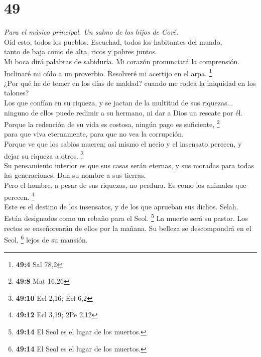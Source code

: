 \hypertarget{section-47}{%
\section{49}\label{section-47}}

\emph{Para el músico principal. Un salmo de los hijos de Coré.}\\
 Oíd esto, todos los pueblos. Escuchad, todos los
habitantes del mundo,\\
 tanto de baja como de alta, ricos y pobres juntos.\\
 Mi boca dirá palabras de sabiduría. Mi corazón
pronunciará la comprensión.\\
 Inclinaré mi oído a un proverbio. Resolveré mi acertijo
en el arpa. \footnote{\textbf{49:4} Sal 78,2}\\
 ¿Por qué he de temer en los días de maldad? cuando me
rodea la iniquidad en los talones?\\
 Los que confían en su riqueza, y se jactan de la multitud
de sus riquezas...\\
 ninguno de ellos puede redimir a su hermano, ni dar a
Dios un rescate por él.\\
 Porque la redención de su vida es costosa, ningún pago es
suficiente, \footnote{\textbf{49:8} Mat 16,26}\\
 para que viva eternamente, para que no vea la
corrupción.\\
 Porque ve que los sabios mueren; así mismo el necio y el
insensato perecen, y dejar su riqueza a otros. \footnote{\textbf{49:10}
  Ecl 2,16; Ecl 6,2}\\
 Su pensamiento interior es que sus casas serán eternas,
y sus moradas para todas las generaciones. Dan su nombre a sus
tierras.\\
 Pero el hombre, a pesar de sus riquezas, no perdura. Es
como los animales que perecen. \footnote{\textbf{49:12} Ecl 3,19; 2Pe
  2,12}\\
 Este es el destino de los insensatos, y de los que
aprueban sus dichos. Selah.\\
 Están designados como un rebaño para el Seol.
\footnote{\textbf{49:14} El Seol es el lugar de los muertos.} La muerte
será su pastor. Los rectos se enseñorearán de ellos por la mañana. Su
belleza se descompondrá en el Seol, \footnote{\textbf{49:14} El Seol es
  el lugar de los muertos.} lejos de su mansión.\\
